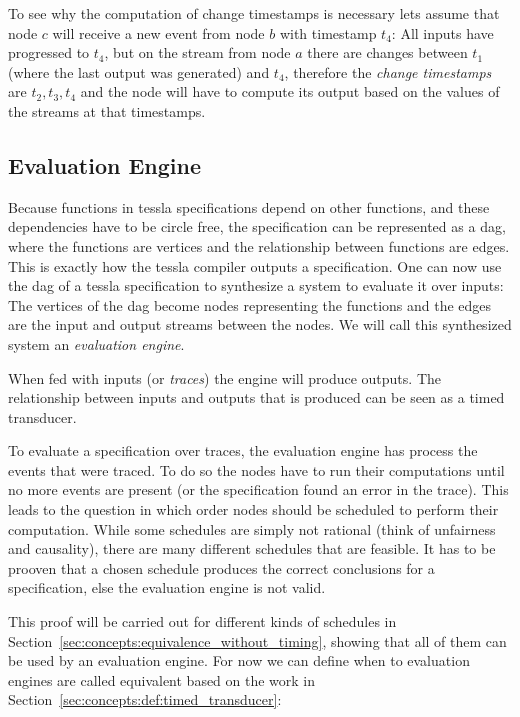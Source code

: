To see why the computation of change timestamps is necessary lets assume that node \(c\) will receive a new event from node \(b\) with timestamp \(t_4\):
All inputs have progressed to \(t_4\), but on the stream from node \(a\) there are changes between \(t_1\) (where the last output was generated) and \(t_4\), therefore the \emph{change timestamps} are \(t_2, t_3, t_4\) and the node will have to compute its output based on the values of the streams at that timestamps.

\subsection{ Evaluation Engine}
\label{sec:concepts:def:eval_engine}

Because functions in \gls{tessla} specifications depend on other functions, and these dependencies have to be circle free, the specification can be represented as a \gls{dag}, where the functions are vertices and the relationship between functions are edges.
This is exactly how the \gls{tessla} compiler outputs a specification.
One can now use the \gls{dag} of a \gls{tessla} specification to synthesize a system to evaluate it over inputs:
The vertices of the \gls{dag} become nodes representing the functions and the edges are the input and output streams between the nodes.
We will call this synthesized system an \emph{evaluation engine}.

When fed with inputs (or \emph{traces}) the engine will produce outputs.
The relationship between inputs and outputs that is produced can be seen as a timed transducer.

To evaluate a specification over traces, the evaluation engine has process the events that were traced.
To do so the nodes have to run their computations until no more events are present (or the specification found an error in the trace).
This leads to the question in which order nodes should be scheduled to perform their computation.
While some schedules are simply not rational (think of unfairness and causality), there are many different schedules that are feasible.
It has to be prooven that a chosen schedule produces the correct conclusions for a specification, else the evaluation engine is not valid.

This proof will be carried out for different kinds of schedules in Section~\ref{sec:concepts:equivalence_without_timing}, showing that all of them can be used by an evaluation engine.
For now we can define when to evaluation engines are called equivalent based on the work in Section~\ref{sec:concepts:def:timed_transducer}:

